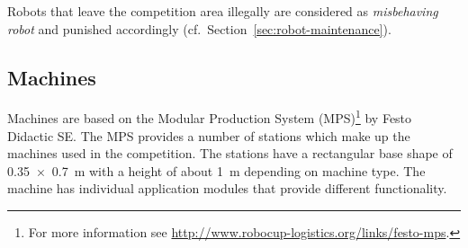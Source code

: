 \documentclass[12pt,twoside]{article}
\newcommand{\refsec}[1]{Section~\ref{#1}}
\begin{document}
Robots that leave the competition area illegally are considered as
\emph{misbehaving robot} and punished accordingly
(cf.~\refsec{sec:robot-maintenance}).

\subsection{Machines}
\label{sec:machines}
Machines are based on the Modular Production System (MPS)\footnote{For
  more information see
  \url{http://www.robocup-logistics.org/links/festo-mps}.} by Festo
Didactic SE. The MPS provides a number of stations which
make up the machines used in the competition. The stations have a
rectangular base shape of \SI{0,35 x 0,7}{\metre} with a height of
about \SI{1}{\metre} depending on machine type. The machine
has individual application modules that provide different
functionality.
\end{document}
